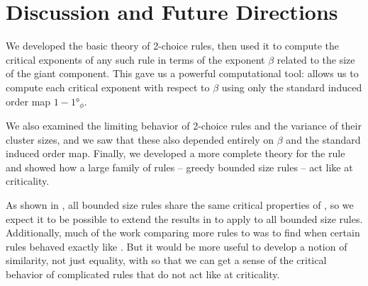 \documentclass[twoside,10pt]{article}
\begin{document}
\section{Discussion and Future Directions}

We developed the basic theory of 2-choice rules, then used it to compute the critical exponents of any such rule in terms of the exponent $\beta$ related to the size of the giant component. This gave us a powerful computational tool:  allows us to compute each critical exponent with respect to $\beta$ using only the standard induced order map $1 - \ang{1}_{\phi}$.

We also examined the limiting behavior of 2-choice rules and the variance of their cluster sizes, and we saw that these also depended entirely on $\beta$ and the standard induced order map. Finally, we developed a more complete theory for the \ER rule and showed how a large family of rules -- greedy bounded size rules -- act like \ER at criticality.

As shown in \cite{RW-bounded}, all bounded size rules share the same critical properties of \ER, so we expect it to be possible to extend the results in  to apply to all bounded size rules. Additionally, much of the work comparing more rules to \ER was to find when certain rules behaved exactly like \ER. But it would be more useful to develop a notion of similarity, not just equality, with \ER so that we can get a sense of the critical behavior of complicated rules that do not act like \ER at criticality.

\printbibliography
\end{document}
